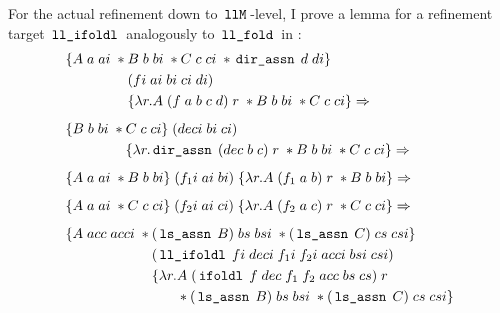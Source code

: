 For the actual refinement down to $\,\text{\ttfamily llM}\,$-level, I prove a lemma for a refinement target $\,\text{\ttfamily ll\_ifoldl}\,$ analogously to $\,\text{\ttfamily ll\_fold}\,$ in :
\begin{align*}
	 & \{A \app a \app ai \app \ast B \app b \app bi \app \ast C \app c \app ci \app \ast \iexp{dir\_assn} \app d \app di\}                                                   \\
	 & \hcont{\{A \app a \app ai \app \ast} (fi \app ai \app bi \app ci \app di)                                                                                              \\
	 & \hcont{\{A \app a \app ai \app \ast} \{\lambda r. A \app (f \app a \app b \app c \app d) \app r \app \ast B \app b \app bi \app \ast C \app c \app ci\} \Rightarrow    \\[0.5em]
	 & \{B \app b \app bi \app \ast C \app c \app ci\} \app (deci \app bi \app ci)                                                                                            \\
	 & \hcont{\{B \app b \app bi \app \ast} \{\lambda r. \iexp{dir\_assn} \app (dec \app b \app c) \app r \app \ast B \app b \app bi \app \ast C \app c \app ci\} \Rightarrow \\[0.5em]
	 & \{A \app a \app ai \app \ast B \app b \app bi\} \app (f_1i \app ai \app bi) \app
	\{\lambda r. A \app (f_1 \app a \app b) \app r \app \ast B \app b \app bi\} \Rightarrow                                                                                   \\[0.5em]
	 & \{A \app a \app ai \app \ast C \app c \app ci\} \app (f_2i \app ai \app ci) \app
	\{\lambda r. A \app (f_2 \app a \app c) \app r \app \ast C \app c \app ci\} \Rightarrow                                                                                   \\[0.5em]
	 & \{A \app acc \app acci \app \ast (\iexp{ls\_assn} \app B) \app bs \app bsi \app \ast (\iexp{ls\_assn} \app C) \app cs \app csi\}                                       \\
	 & \hcont{\{A \app acc \app acci \app \ast} (\iexp{ll\_ifoldl} \app fi \app deci \app f_1i \app f_2i \app acci \app bsi \app csi)                                         \\
	 & \hcont{\{A \app acc \app acci \app \ast} \{\lambda r. A \app (\iexp{ifoldl} \app f \app dec \app f_1 \app f_2 \app acc \app bs \app cs) \app r                         \\
	 & \hcont{\{A \app acc \app acci \app \ast \{\lambda r.} \ast (\iexp{ls\_assn} \app B) \app bs \app bsi \app \ast (\iexp{ls\_assn} \app C) \app cs \app csi\}
\end{align*}
